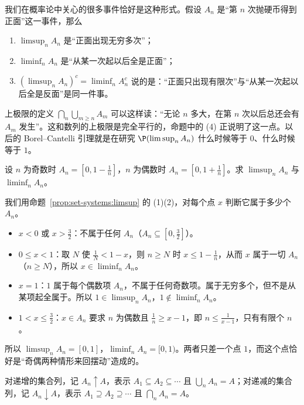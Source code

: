 \begin{remark}[上极限与下极限的概率意义]
我们在概率论中关心的很多事件恰好是这种形式。假设 $A_n$ 是“第 $n$ 次抛硬币得到正面”这一事件，那么
\begin{enumerate}
\item $\limsup_nA_n$ 是“正面出现无穷多次”；
\item $\liminf_nA_n$ 是“从某一次起以后全是正面”；
\item $(\limsup_nA_n)^c=\liminf_nA_n^c$ 说的是：“正面只出现有限次”与“从某一次起以后全是反面”是同一件事。
\end{enumerate}
上极限的定义 $\bigcap_n\bigcup_{m\geqslant n}A_m$ 可以这样读：“无论 $n$ 多大，在第 $n$ 次以后总还会有 $A_m$ 发生”。这和数列的上极限是完全平行的，命题中的 (4) 正说明了这一点。以后的 Borel--Cantelli 引理就是在研究 $\P(\limsup_nA_n)$ 什么时候等于 $0$、什么时候等于 $1$。
\end{remark}

\begin{workedexample}\label{we:set-systems:limsup}
设 $n$ 为奇数时 $A_n=[0,1-\frac1n]$，$n$ 为偶数时 $A_n=[0,1+\frac1n]$。求 $\limsup_nA_n$ 与 $\liminf_nA_n$。
\end{workedexample}
\begin{solution}
我们用命题~\ref{prop:set-systems:limsup} 的 (1)(2)，对每个点 $x$ 判断它属于多少个 $A_n$。
\begin{itemize}
\item $x<0$ 或 $x>\frac32$：不属于任何 $A_n$（$A_n\subseteq[0,\frac32]$）。
\item $0\leqslant x<1$：取 $N$ 使 $\frac1N<1-x$，则 $n\geqslant N$ 时 $x\leqslant1-\frac1n$，从而 $x$ 属于一切 $A_n$（$n\geqslant N$），所以 $x\in\liminf_nA_n$。
\item $x=1$：$1$ 属于每个偶数项 $A_n$，不属于任何奇数项。属于无穷多个，但不是从某项起全属于。所以 $1\in\limsup_nA_n$，$1\notin\liminf_nA_n$。
\item $1<x\leqslant\frac32$：$x\in A_n$ 要求 $n$ 为偶数且 $\frac1n\geqslant x-1$，即 $n\leqslant\frac1{x-1}$，只有有限个 $n$。
\end{itemize}
所以 $\limsup_nA_n=[0,1]$，$\liminf_nA_n=[0,1)$。两者只差一个点 $1$，而这个点恰好是“奇偶两种情形来回摆动”造成的。
\end{solution}

对递增的集合列，记 $A_n\uparrow A$，表示 $A_1\subseteq A_2\subseteq\cdots$ 且 $\bigcup_nA_n=A$；对递减的集合列，记 $A_n\downarrow A$，表示 $A_1\supseteq A_2\supseteq\cdots$ 且 $\bigcap_nA_n=A$。

